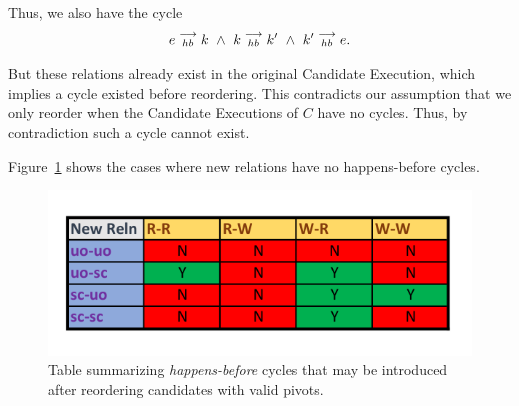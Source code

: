    Thus, we also have the cycle 
    \begin{align*}
        \reln{e}{hb}{k} \ \wedge \
        \reln{k}{hb}{k'} \ \wedge \ 
        \reln{k'}{hb}{e}. 
    \end{align*}

    But these relations already exist in the original Candidate Execution, which implies a cycle existed before reordering. 
    This contradicts our assumption that we only reorder when the Candidate Executions of $C$ have no cycles. 
    Thus, by contradiction such a cycle cannot exist.

    Figure~\ref{reord:cycle_table} shows the cases where new relations have no happens-before cycles. 
    \begin{figure}[H]
        \centering
        \includegraphics[scale=0.7]{4.InstructionReordering/4.ValidReorderingCandidate/ProofParts/Part3/part3_table.pdf}
        \caption{Table summarizing \textit{happens-before} cycles that may be introduced after reordering candidates with valid pivots.}
        \label{reord:cycle_table}
    \end{figure}